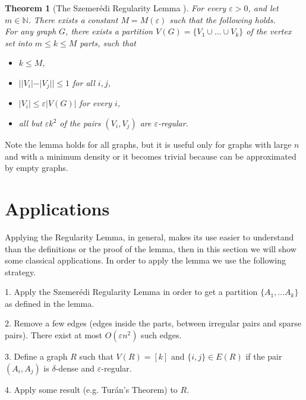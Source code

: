 \documentclass[12pt,twoside,a4paper,bibliography=totocnumbered]{book}
\numberwithin{equation}{section}
\newtheorem{theorem}             {Theorem}[section]
\theoremstyle{remark}
\begin{document}
\begin{theorem}[{The Szemerédi Regularity Lemma \cite{Sz75}}]\label{theorem:Sz}For every $\varepsilon > 0$, and let $m \in  \mathbb{N}$. There exists a constant $M=M(\varepsilon)$ such that the following holds.\\
For any graph $G$, there exists a partition $V(G) = \{V_1 \cup \ldots \cup V_k\}$ of the vertex set into $m \leq k \leq M$ parts, such that
\begin{itemize}

	\item $k \leq M$,
	\item $||V_i|-|V_j|| \leq 1$ for all $i,j$,
	
	\item $|V_i| \leq \varepsilon|V(G)|$ for every $i$,
	\item all but $\varepsilon k^2$ of the pairs $(V_i, V_j)$ are $\varepsilon$-regular. 
\end{itemize}
\end{theorem}

Note the lemma holds for all graphs, but it is useful only for graphs with large $n$ and with a minimum density or it becomes trivial because can be approximated by empty graphs.%

\section{Applications}
Applying the Regularity Lemma, in general, makes its use easier to understand than the definitions or the proof of the lemma, then in this section we will show some classical applications. In order to apply the lemma we use the following strategy.

1. Apply the Szemerédi Regularity Lemma in order to get a partition $ \{ A_1, \ldots A_k \} $ as defined in the lemma.

2. Remove a few edges (edges inside the parts, between irregular pairs and sparse pairs). There exist at most $O(\varepsilon n^2)$ such edges.

3. Define a graph $R$ such that $V(R) = [k]$ and $\{i,j\} \in E(R) $ if  the pair $(A_i, A_j)$ is $\delta$-dense and $\varepsilon$-regular.

4. Apply some result (e.g. Turán's Theorem) to $R$.
\end{document}
